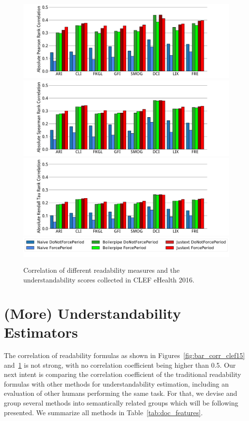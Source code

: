 \begin{figure}[th!]
   \centering
    \includegraphics[width=1.\textwidth]{graphics/bar_corr_pearson16_values}
    \includegraphics[width=1.\textwidth]{graphics/bar_corr_spearman16_values}
    \includegraphics[width=1.\textwidth]{graphics/bar_corr_kendalltau16_values}
    \includegraphics[width=1\textwidth]{graphics/legend62}
    \caption{Correlation of different readability measures and the understandability scores collected in CLEF eHealth 2016.}
   \label{fig:bar_corr_clef16}
\end{figure}


\section{(More) Understandability Estimators}
\label{sec:proxies}

The correlation of readability formulas as shown in Figures~\ref{fig:bar_corr_clef15} and~\ref{fig:bar_corr_clef16} is not strong, with no correlation coefficient being higher than 0.5.
Our next intent is comparing the correlation coefficient of the traditional readability formulas with other methods for understandability estimation, including an evaluation of other humans performing the same task.
For that, we devise and group several methods into semantically related groups which will be following presented.
We summarize all methods in Table~\ref{tab:doc_features}.

